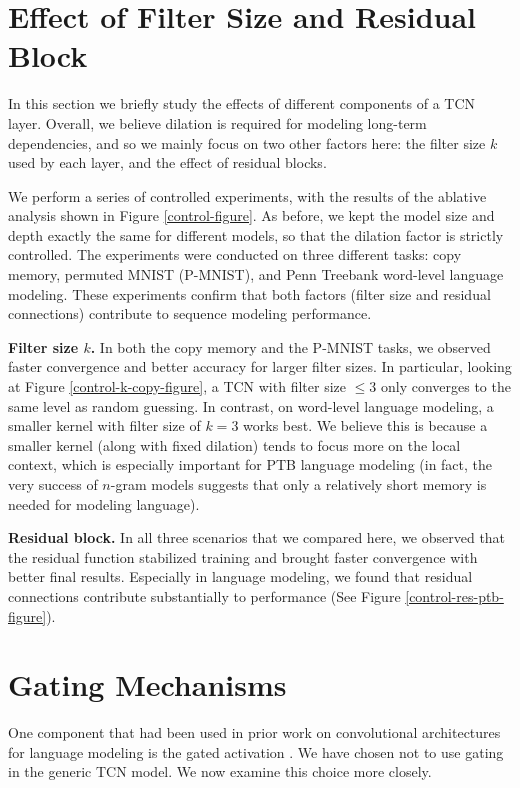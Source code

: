\documentclass{article}
\begin{document}
\section{Effect of Filter Size and Residual Block}
\label{app-control}

In this section we briefly study the effects of different components of a TCN
layer. Overall, we believe dilation is required
for modeling long-term dependencies, and so we mainly focus on two other
factors here: the filter size $k$ used by each layer, and the effect of
residual blocks.

We perform a series of controlled experiments, with the results of the ablative
analysis shown in Figure \ref{control-figure}. As before, we kept the model size
and depth exactly the same for different models, so that the dilation
factor is strictly controlled. The experiments were conducted on three
different tasks: copy memory, permuted MNIST (P-MNIST), and Penn Treebank word-level language modeling. These experiments confirm that both factors (filter size and residual connections) contribute to sequence modeling performance.

\textbf{Filter size $k$.} In both the copy memory and the P-MNIST tasks,
we observed faster convergence and better accuracy for larger filter sizes. In particular,
looking at Figure \ref{control-k-copy-figure}, a TCN with filter size $\leq 3$ only
converges to the same level as random guessing. In contrast, on word-level language
modeling, a smaller kernel with filter size of $k=3$ works best. We
believe this is because a smaller kernel (along with fixed dilation) tends to focus
more on the local context, which is especially important for PTB language modeling (in
fact, the very success of $n$-gram models suggests that only a relatively short memory
is needed for modeling language).

\textbf{Residual block.} In all three scenarios that we compared here, we observed
that the residual function stabilized training and brought faster convergence
with better final results. Especially in language modeling, we found
that residual connections contribute substantially to performance (See Figure
\ref{control-res-ptb-figure}).


\section{Gating Mechanisms}
\label{gating-mech}

One component that had been used in prior work on convolutional
architectures for language modeling is the gated activation \cite{waveNet,dauphinGatedConv}. We have
chosen not to use gating in the generic TCN model. We now examine this choice more closely.
\end{document}

